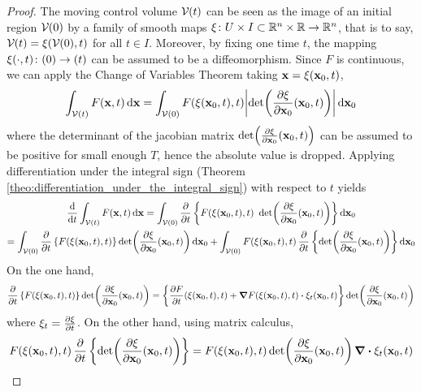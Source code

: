 \begin{proof}
	The moving control volume $\mathcal{V}_{}(t)$ can be seen as the image of an initial region $\mathcal{V}_{}(0)$ by a family of smooth maps $\xi \colon U \times I \subset \mathbb{R}^n \times \mathbb{R} \rightarrow \mathbb{R}^n$, that is to say, $\mathcal{V}_{}(t) = \xi(\mathcal{V}_{}(0),t)$ for all $t \in I$. Moreover, by fixing one time $t$, the mapping $\xi(\cdot, t) \colon \vb{}(0) \rightarrow \vb{}(t)$ can be assumed to be a diffeomorphism. Since $F$ is continuous, we can apply the Change of Variables Theorem taking $\vb{x} = \xi(\vb{x}_0,t)$,
	\begin{equation*}
		\int_{\mathcal{V}(t)} F(\vb{x},t) \dd{\vb{x}} = 
		\int_{\mathcal{V}_{}(0)} F(\xi(\vb{x}_0,t), t) \abs{\det(\frac{\partial \xi}{\partial \vb{x}_0} (\vb{x}_0, t))} \dd{\vb{x}_0}
	\end{equation*}
	where the determinant of the jacobian matrix $\det(\frac{\partial \xi}{\partial \vb{x}_0} (\vb{x}_0, t))$ can be assumed to be positive for small enough $T$, hence the absolute value is dropped. Applying differentiation under the integral sign (Theorem \ref{theo:differentiation_under_the_integral_sign}) with respect to $t$ yields
	\begin{multline*}
		\frac{\dd}{\dd{t}} \int_{\mathcal{V}(t)} F(\vb{x}, t) \dd{\vb{x}} = 
		\int_{\mathcal{V}_{}(0)} \pdv{t} 
		\left\{
		F(\xi(\vb{x}_0,t), t) \ \det(\frac{\partial \xi}{\partial \vb{x}_0} (\vb{x}_0, t))
		\right\}
		\dd{\vb{x}_0} 
		\\
		= 
		\int_{\mathcal{V}_{}(0)} 
		\pdv{t} \left\{ F(\xi(\vb{x}_0,t), t) \right\} \det(\frac{\partial \xi}{\partial \vb{x}_0} (\vb{x}_0, t)) \dd{\vb{x}_0} + 
		\int_{\mathcal{V}_{}(0)} F(\xi(\vb{x}_0,t), t) \, \pdv{t} \left\{ \det(\frac{\partial \xi}{\partial \vb{x}_0} (\vb{x}_0, t)) \right\} \dd{\vb{x}_0}
	\end{multline*}
	On the one hand,
	\begin{equation*}
		\pdv{t} \left\{ F(\xi(\vb{x}_0,t), t) \right\} \det(\frac{\partial \xi}{\partial \vb{x}_0} (\vb{x}_0, t)) = 
		\left\{ 
		\frac{\partial F}{\partial t} (\xi(\vb{x}_0, t), t) + 
		\grad{F(\xi(\vb{x}_0, t), t)} \vdot \xi_t (\vb{x}_0, t)
		\right\}
		\det(\frac{\partial \xi}{\partial \vb{x}_0} (\vb{x}_0, t))
	\end{equation*}
	where $\xi_t = \pdv{\xi}{t}$. On the other hand, using matrix calculus,
	\begin{equation*}
		F(\xi(\vb{x}_0,t), t) \, \pdv{t} \left\{ \det(\frac{\partial \xi}{\partial \vb{x}_0} (\vb{x}_0, t)) \right\} = 
		F(\xi(\vb{x}_0,t), t) \det(\frac{\partial \xi}{\partial \vb{x}_0} (\vb{x}_0, t)) \, \div{\xi_t(\vb{x}_0,t)}

\end{equation*}
\end{proof}
